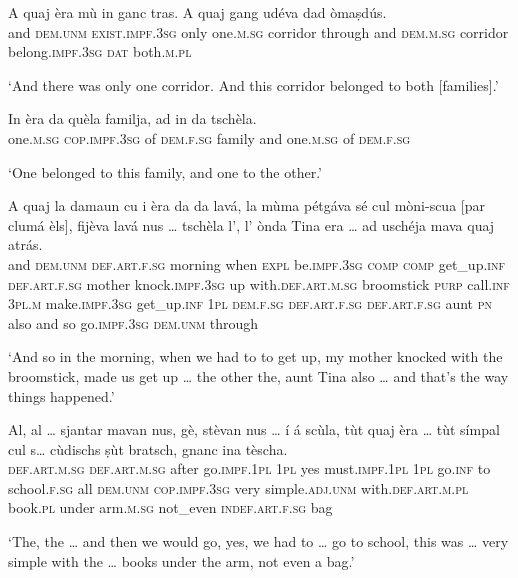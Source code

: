 \begin{linenumbers}
\gll    A quaj èra mù in ganc tras. A quaj gang udéva dad òmaṣdús.\\
and \textsc{dem.unm} \textsc{exist.impf.3sg} only one.\textsc{m.sg} corridor through and \textsc{dem.m.sg} corridor belong.\textsc{impf.3sg} \textsc{dat} both.\textsc{m.pl}\\
\end{linenumbers}
\medskip
\glt `And there was only one corridor. And this corridor belonged to both [families].'
\medskip

\begin{linenumbers}
\gll    In èra da quèla familja, ad in da tschèla.\\
one.\textsc{m.sg} \textsc{cop.impf.3sg} of \textsc{dem.f.sg} family and one.\textsc{m.sg} of \textsc{dem.f.sg}\\
\end{linenumbers}
\medskip
\glt `One belonged to this family, and one to the other.'
\medskip

\begin{linenumbers}
\gll    A quaj la damaun cu i èra da da lavá, la mùma pétgáva sé cul mòni-scua [par clumá èls], fijèva lavá nus … tschèla l’, l’ ònda Tina era … ad uschéja mava quaj atrás.\\
and \textsc{dem.unm} \textsc{def.art.f.sg} morning when \textsc{expl} be.\textsc{impf.3sg} \textsc{comp} \textsc{comp} get\_up.\textsc{inf} \textsc{def.art.f.sg} mother knock.\textsc{impf.3sg} up with.\textsc{def.art.m.sg} broomstick \textsc{purp} call.\textsc{inf} \textsc{3pl.m} make.\textsc{impf.3sg} get\_up.\textsc{inf} \textsc{1pl} {} \textsc{dem.f.sg} \textsc{def.art.f.sg} \textsc{def.art.f.sg} aunt \textsc{pn} also {} and so go.\textsc{impf.3sg} \textsc{dem.unm} through    \\
\end{linenumbers}
\medskip
\glt `And so in the morning, when we had to to get up, my mother knocked with the broomstick, made us get up … the other the, aunt Tina also … and that’s the way things happened.'
\medskip

\begin{linenumbers}
\gll    Al, al … sjantar mavan nus, gè, stèvan nus … í á scùla, tùt quaj èra … tùt símpal cul s… cùdischs ṣùt bratsch, gnanc ina tèscha.\\
\textsc{def.art.m.sg} \textsc{def.art.m.sg} {} after go.\textsc{impf.1pl} \textsc{1pl} yes  must.\textsc{impf.1pl} \textsc{1pl} {}  go.\textsc{inf} to school.\textsc{f.sg} all \textsc{dem.unm} \textsc{cop.impf.3sg} {} very simple.\textsc{adj.unm} with.\textsc{def.art.m.pl} {} book.\textsc{pl} under arm.\textsc{m.sg} not\_even \textsc{indef.art.f.sg} bag\\
\end{linenumbers}
\medskip
\glt `The, the … and then we would go, yes, we had to … go to school, this was … very simple with the … books under the arm, not even a bag.'
\medskip

